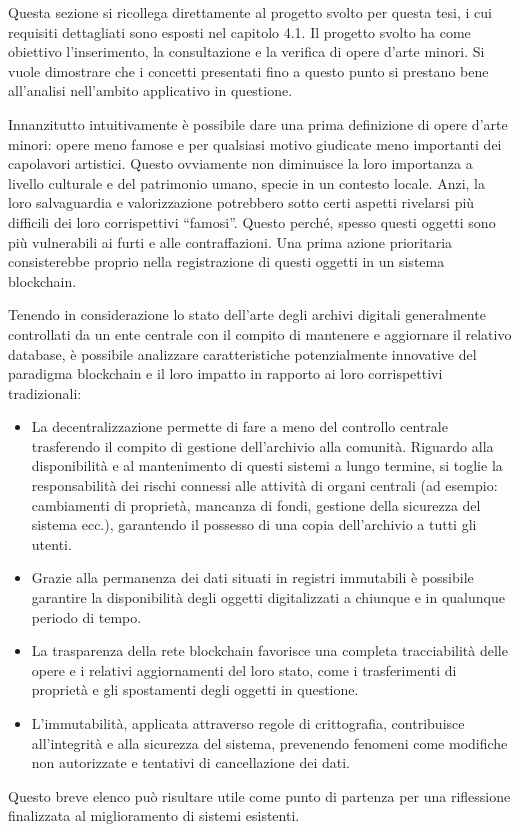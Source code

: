 Questa sezione si ricollega direttamente al progetto svolto per questa tesi, i cui requisiti dettagliati sono esposti nel capitolo 4.1. Il progetto svolto ha come obiettivo l’inserimento, la consultazione e la verifica di opere d’arte minori. Si vuole dimostrare che i concetti presentati fino a questo punto si prestano bene all'analisi nell’ambito applicativo in questione.

Innanzitutto intuitivamente è possibile dare una prima definizione di opere d’arte minori: opere meno famose e per qualsiasi motivo giudicate meno importanti dei capolavori artistici. Questo ovviamente non diminuisce la loro importanza a livello culturale e del patrimonio umano, specie in un contesto locale. Anzi, la loro salvaguardia e valorizzazione potrebbero sotto certi aspetti rivelarsi più difficili dei loro corrispettivi “famosi”. Questo perché, spesso questi oggetti sono più vulnerabili ai furti e alle contraffazioni. Una prima azione prioritaria consisterebbe proprio nella registrazione di questi oggetti in un sistema blockchain.

Tenendo in considerazione lo stato dell'arte degli archivi digitali generalmente controllati da un ente centrale con il compito di mantenere e aggiornare il relativo database, è possibile analizzare caratteristiche potenzialmente innovative del paradigma blockchain e il loro impatto in rapporto ai loro corrispettivi tradizionali:

\begin{itemize}
\item La decentralizzazione permette di fare a meno del controllo centrale trasferendo il compito di gestione dell’archivio alla comunità. Riguardo alla disponibilità e al mantenimento di questi sistemi a lungo termine, si toglie la responsabilità dei rischi connessi alle attività di organi centrali (ad esempio: cambiamenti di proprietà, mancanza di fondi, gestione della sicurezza del sistema ecc.), garantendo il possesso di una copia dell’archivio a tutti gli utenti. 
\item Grazie alla permanenza dei dati situati in registri immutabili è possibile garantire la disponibilità degli oggetti digitalizzati a chiunque e in qualunque periodo di tempo. 
\item La trasparenza della rete blockchain favorisce una completa tracciabilità delle opere e i relativi aggiornamenti del loro stato, come i trasferimenti di proprietà e gli spostamenti degli oggetti in questione.
\item L'immutabilità, applicata attraverso regole di crittografia, contribuisce all’integrità e alla sicurezza del sistema, prevenendo fenomeni come modifiche non autorizzate e tentativi di cancellazione dei dati.
\end{itemize}

Questo breve elenco può risultare utile come punto di partenza per una riflessione finalizzata al miglioramento di sistemi esistenti.